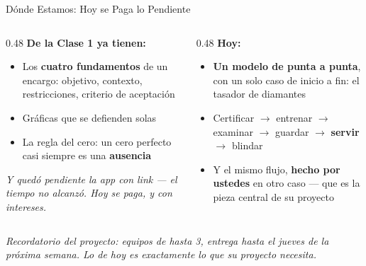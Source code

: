 \documentclass[aspectratio=169, 11pt]{beamer}
\begin{document}
\begin{frame}[shrink=5]{Dónde Estamos: Hoy se Paga lo Pendiente}
  \vspace{-2pt}
  \begin{columns}[T]
    \begin{column}{0.48\textwidth}
      {\small\color{arcaDark}\bfseries\faCheckCircle\hspace{5pt}De la Clase 1 ya tienen:}
      \vspace{4pt}
      {\footnotesize\color{textMuted}
      \begin{itemize}\setlength{\itemsep}{4pt}
        \item[{\color{codeGreen}\scriptsize\faCheck}]
          Los \textbf{cuatro fundamentos} de un encargo: objetivo, contexto,
          restricciones, criterio de aceptación
        \item[{\color{codeGreen}\scriptsize\faCheck}]
          Gráficas que se defienden solas
        \item[{\color{codeGreen}\scriptsize\faCheck}]
          La regla del cero: un cero perfecto casi siempre es una
          \textbf{ausencia}
      \end{itemize}}
      \vspace{4pt}
      {\scriptsize\color{textMuted}\itshape
       Y quedó pendiente la app con link --- el tiempo no alcanzó. Hoy se
       paga, y con intereses.}
    \end{column}
    \begin{column}{0.48\textwidth}
      {\small\color{arcaDark}\bfseries\faForward\hspace{5pt}Hoy:}
      \vspace{4pt}
      {\footnotesize\color{textMuted}
      \begin{itemize}\setlength{\itemsep}{4pt}
        \item[{\color{arcaRed}\scriptsize\faArrowRight}]
          \textbf{Un modelo de punta a punta}, con un solo caso de inicio a
          fin: el tasador de diamantes
        \item[{\color{arcaRed}\scriptsize\faArrowRight}]
          Certificar $\to$ entrenar $\to$ examinar $\to$ guardar $\to$
          \textbf{servir} $\to$ blindar
        \item[{\color{arcaRed}\scriptsize\faStar}]
          Y el mismo flujo, \textbf{hecho por ustedes} en otro caso ---
          que es la pieza central de su proyecto
      \end{itemize}}
    \end{column}
  \end{columns}
  \vspace{4pt}
  {\scriptsize\color{arcaDark}\itshape
   Recordatorio del proyecto: equipos de hasta 3, entrega hasta el jueves de
   la próxima semana. Lo de hoy es exactamente lo que su proyecto necesita.}
\end{frame}
\end{document}
